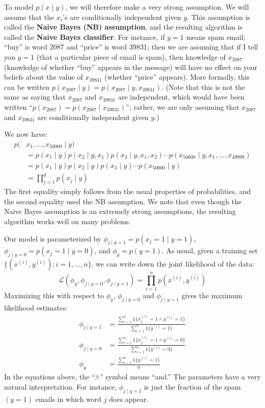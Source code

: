 To model $p(x \mid y)$, we will therefore make a very strong assumption. We will
assume that the $x_i$'s are conditionally independent given $y$. This assumption
is called the \textbf{Naive Bayes (NB) assumption}, and the resulting algorithm is
called the \textbf{Naive Bayes classifier}. For instance, if $y = 1$ means spam email;
``buy'' is word 2087 and ``price'' is word 39831; then we are assuming that if
I tell you $y = 1$ (that a particular piece of email is spam), then knowledge
of $x_{2087}$ (knowledge of whether ``buy'' appears in the message) will have no
effect on your beliefs about the value of $x_{39831}$ (whether ``price'' appears).
More formally, this can be written $p(x_{2087} \mid y) = p(x_{2087} \mid y, x_{39831})$. (Note that
this is not the same as saying that $x_{2087}$ and $x_{39831}$ are independent, which
would have been written ``$p(x_{2087}) = p(x_{2087} \mid x_{39831})$''; rather, we are only
assuming that $x_{2087}$ and $x_{39831}$ are conditionally independent given $y$.)

We now have:
\begin{align}
    p(&x_1 ,\ldots,x_{50000} \mid y)\\
    &= p(x_1 \mid y)p(x_2 \mid y,x_1 )p(x_3 \mid y,x_1 ,x_2 )\cdots p(x_{50000} \mid y,x_1 ,\ldots,x_{49999} )\\
    &= p(x_1 \mid y)p(x_2 \mid y)p(x_3 \mid y)\cdots p(x_{50000} \mid y)\\
    &= \prod_{j=1}^d p(x_j \mid y)
\end{align}
The first equality simply follows from the usual properties of probabilities,
and the second equality used the NB assumption. We note that even though
the Naive Bayes assumption is an extremely strong assumptions, the resulting
algorithm works well on many problems.

Our model is parameterized by $\phi_{j \mid y=1} = p(x_j = 1 \mid y = 1)$, $\phi_{j \mid y=0} = p(x_j =
1 \mid y = 0)$, and $\phi_y = p(y = 1)$. As usual, given a training set $\{(x^{(i)} ,y^{(i)});i =
1,\ldots,n\}$, we can write down the joint likelihood of the data:
\begin{equation}
    \mathcal L(\phi_y ,\phi_{j \mid y=0}, \phi_{j \mid y=1}) = \prod_{i=1}^n p(x^{(i)}, y^{(i)})
\end{equation}
Maximizing this with respect to $\phi_y$, $\phi_{j \mid y=0}$ and $\phi_{j \mid y=1}$ gives the maximum
likelihood estimates:
\begin{align}
    \phi_{j \mid y=1} &= \frac{\sum_{i=1}^n \mathbb{1}\{x_j^{(i)} = 1 \wedge y^{(i)} = 1 \}}{\sum_{i=1}^n \mathbb{1}\{ y^{(i)} = 1 \}}\\
    \phi_{j \mid y=0} &= \frac{\sum_{i=1}^n \mathbb{1}\{x_j^{(i)} = 1 \wedge y^{(i)} = 0 \}}{\sum_{i=1}^n \mathbb{1}\{ y^{(i)} = 0 \}}\\
    \phi_y &= \frac{\sum_{i=1}^n \mathbb{1}\{y^{(i)} = 1\}}{n}
\end{align}
In the equations above, the ``$\wedge$'' symbol means ``and.'' The parameters have
a very natural interpretation. For instance, $\phi_{j \mid y=1}$ is just the fraction of the
spam $(y = 1)$ emails in which word $j$ does appear.


